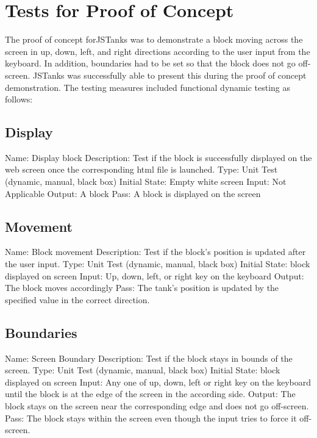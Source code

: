 \documentclass{article}
\begin{document}
\section{Tests for Proof of Concept}
The proof of concept forJSTanks was to demonstrate a block moving across the screen in up, down, left, and right directions according to the user input from the keyboard. In addition, boundaries had to be set so that the block does not go off-screen. JSTanks was successfully able to present this during the proof of concept demonstration. The testing measures included functional dynamic testing as follows:
\subsection{Display}
Name: Display block\newline
Description: Test if the block is successfully displayed on the web screen once the corresponding html file is launched.\newline
Type: Unit Test (dynamic, manual, black box)\newline
Initial State: Empty white screen\newline
Input: Not Applicable\newline
Output: A block\newline
Pass: A block is displayed on the screen
\subsection{Movement}
Name: Block movement\newline
Description: Test if the block’s position is updated after the user input.\newline
Type: Unit Test (dynamic, manual, black box)\newline
Initial State: block displayed on screen\newline
Input: Up, down, left, or right key on the keyboard\newline
Output: The block moves accordingly\newline
Pass: The tank’s position is updated by the specified value in the correct direction.
\subsection{Boundaries}
Name: Screen Boundary\newline
Description: Test if the block stays in bounds of the screen.\newline
Type: Unit Test (dynamic, manual, black box)\newline
Initial State: block displayed on screen\newline
Input: Any one of up, down, left or right key on the keyboard until the block is at the edge of the screen in the according side.\newline
Output: The block stays on the screen near the corresponding edge and does not go off-screen.\newline
Pass: The block stays within the screen even though the input tries to force it off-screen.
\end{document}
